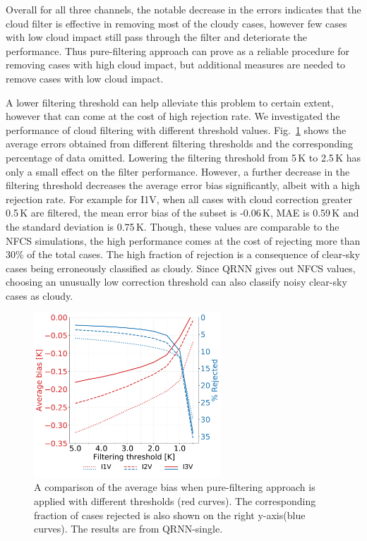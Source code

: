 \documentclass[amt, manuscript]{copernicus}
\begin{document}
Overall for all three channels, the notable decrease in the errors indicates that the cloud filter is effective in removing most of the cloudy cases, however few cases with low cloud impact still pass through the filter and deteriorate the performance. Thus pure-filtering approach can prove as a reliable procedure for removing cases with high cloud impact, but additional measures are needed to remove cases with low cloud impact.

A lower filtering threshold can help alleviate this problem to certain extent, however that can come at the cost of high rejection rate. We investigated the performance of cloud filtering with different threshold values. Fig.~\ref{fig:filtering_thresholds} shows the average errors obtained from different filtering thresholds and the corresponding percentage of data omitted. Lowering the filtering threshold from 5\,K to 2.5\,K has only a small effect on the filter performance. However, a further decrease in the filtering threshold decreases the average error bias significantly, albeit with a high rejection rate. For example for I1V, when all cases with cloud correction greater 0.5\,K are filtered, the mean error bias of the subset is -0.06\,K, MAE is 0.59\,K and the standard deviation is 0.75\,K. Though, these values are comparable to the NFCS simulations, the high performance comes at the cost of rejecting more than 30\% of the total cases. The high fraction of rejection is a consequence of clear-sky cases being erroneously classified as cloudy. Since QRNN gives out NFCS values, choosing an unusually low correction threshold can also classify noisy clear-sky cases as cloudy. 

\begin{figure}[t]
	\includegraphics[width=70mm]{Figures/different_filtering_thresholds.pdf} 
	\caption{A comparison of the  average bias when pure-filtering approach is applied with different thresholds (red curves). The corresponding fraction of cases rejected is also shown on the right y-axis(blue curves). The results are from QRNN-single. }
	\label{fig:filtering_thresholds}	
\end{figure} 
\end{document}
